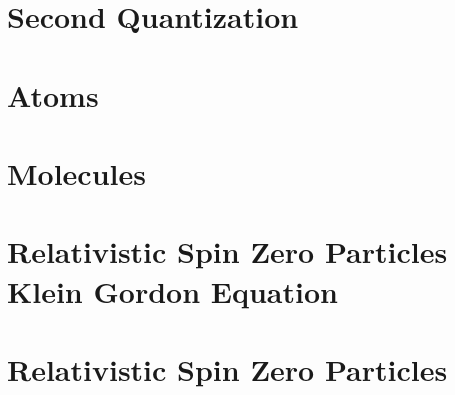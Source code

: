 \documentclass[11pt,twoside,openright]{book}
\begin{document}
\chapter{Second Quantization}







\chapter{Atoms}











\chapter{Molecules}







\chapter{Relativistic Spin Zero Particles Klein Gordon Equation}

\chapter{Relativistic Spin Zero Particles}











\end{document}
